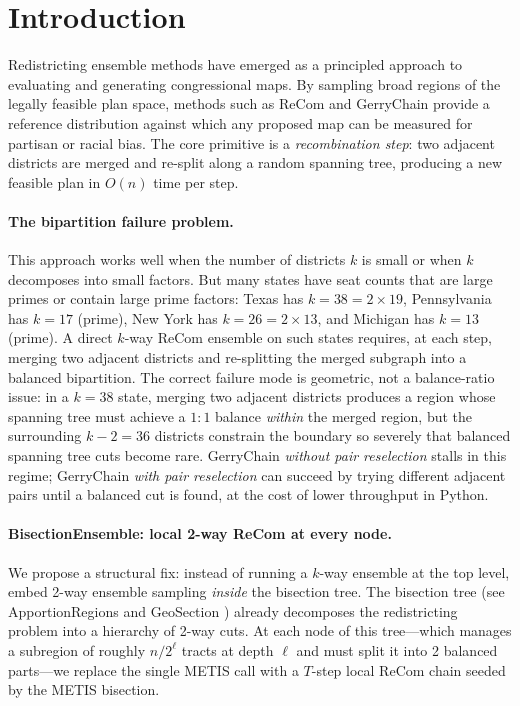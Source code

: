\section{Introduction}
\label{sec:intro}

Redistricting ensemble methods have emerged as a principled approach to
evaluating and generating congressional maps. By sampling broad regions of the
legally feasible plan space, methods such as ReCom \citep{deford2021recombination}
and GerryChain \citep{duchin2019gerrychain} provide a reference distribution
against which any proposed map can be measured for partisan or racial bias.
The core primitive is a \emph{recombination step}: two adjacent districts are
merged and re-split along a random spanning tree, producing a new feasible plan
in $O(n)$ time per step.

\paragraph{The bipartition failure problem.}
This approach works well when the number of districts $k$ is small or when
$k$ decomposes into small factors. But many states have seat counts that are
large primes or contain large prime factors: Texas has $k = 38 = 2 \times 19$,
Pennsylvania has $k = 17$ (prime), New York has $k = 26 = 2 \times 13$,
and Michigan has $k = 13$ (prime). A direct $k$-way ReCom ensemble on such
states requires, at each step, merging two adjacent districts and re-splitting
the merged subgraph into a balanced bipartition. The correct failure mode is
geometric, not a balance-ratio issue: in a $k=38$ state, merging two adjacent
districts produces a region whose spanning tree must achieve a $1:1$ balance
\emph{within} the merged region, but the surrounding $k-2 = 36$ districts
constrain the boundary so severely that balanced spanning tree cuts become rare.
GerryChain \emph{without pair reselection} stalls in this regime; GerryChain
\emph{with pair reselection} can succeed by trying different adjacent pairs
until a balanced cut is found, at the cost of lower throughput in Python.

\paragraph{BisectionEnsemble: local 2-way ReCom at every node.}
We propose a structural fix: instead of running a $k$-way ensemble at the top
level, embed 2-way ensemble sampling \emph{inside} the bisection tree. The
bisection tree (see ApportionRegions \citep{dellaLibera2026apportion} and
GeoSection \citep{dellaLibera2026geosection}) already decomposes the redistricting
problem into a hierarchy of 2-way cuts. At each node of this tree---which
manages a subregion of roughly $n/2^\ell$ tracts at depth $\ell$ and must split it into
2 balanced parts---we replace the single METIS call with a $T$-step local
ReCom chain seeded by the METIS bisection.

